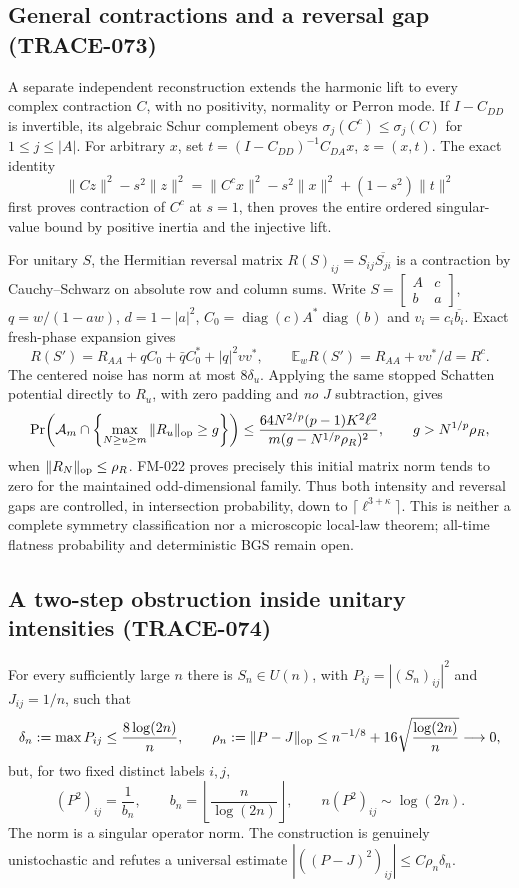 \subsection{General contractions and a reversal gap (TRACE-073)}
A separate independent reconstruction extends the harmonic lift to every
complex contraction $C$, with no positivity, normality or Perron mode.
If $I-C_{DD}$ is invertible, its algebraic Schur complement obeys
$\sigma_j(C^c)\le\sigma_j(C)$ for $1\le j\le|A|$. For arbitrary $x$, set
$t=(I-C_{DD})^{-1}C_{DA}x$, $z=(x,t)$. The exact identity
\[
 \|Cz\|^2-s^2\|z\|^2
 =\|C^cx\|^2-s^2\|x\|^2+(1-s^2)\|t\|^2
\]
first proves contraction of $C^c$ at $s=1$, then proves the entire ordered
singular-value bound by positive inertia and the injective lift.

For unitary $S$, the Hermitian reversal matrix
$R(S)_{ij}=S_{ij}\overline{S_{ji}}$ is a contraction by Cauchy--Schwarz
on absolute row and column sums. Write $S=\left[\begin{smallmatrix}A&c\\b&a\end{smallmatrix}\right]$,
$q=w/(1-aw)$, $d=1-|a|^2$, $C_0=\operatorname{diag}(c)A^*\operatorname{diag}(b)$
and $v_i=c_i\overline{b_i}$. Exact fresh-phase expansion gives
\[
 R(S')=R_{AA}+qC_0+\bar qC_0^*+|q|^2vv^*,
 \qquad \mathbb E_wR(S')=R_{AA}+vv^*/d=R^c.
\]
The centered noise has norm at most $8\delta_u$. Applying the same stopped
Schatten potential directly to $R_u$, with zero padding and \emph{no}
$J$ subtraction, gives
\[
 \Pr\!\left(\mathcal A_m\cap
        \left\{\max_{N\ge u\ge m}\|R_u\|_{\rm op}\ge g\right\}\right)
 \le\frac{64N^{2/p}(p-1)K^2\ell^2}
              {m(g-N^{1/p}\rho_R)^2},
 \qquad g>N^{1/p}\rho_R,
\]
when $\|R_N\|_{\rm op}\le\rho_R$. FM-022 proves precisely this initial
matrix norm tends to zero for the maintained odd-dimensional family.
Thus both intensity and reversal gaps are controlled, in intersection
probability, down to $\lceil\ell^{3+\kappa}\rceil$. This is neither a
complete symmetry classification nor a microscopic local-law theorem;
all-time flatness probability and deterministic BGS remain open.

\subsection{A two-step obstruction inside unitary intensities (TRACE-074)}
For every sufficiently large $n$ there is $S_n\in U(n)$, with
$P_{ij}=|(S_n)_{ij}|^2$ and $J_{ij}=1/n$, such that
\[
 \delta_n:=\max P_{ij}\le\frac{8\log(2n)}n,\qquad
 \rho_n:=\|P-J\|_{\rm op}\le n^{-1/8}
             +16\sqrt{\frac{\log(2n)}n}\longrightarrow0,
\]
but, for two fixed distinct labels $i,j$,
\[
 (P^2)_{ij}=\frac1{b_n},\qquad
 b_n=\left\lfloor\frac n{\log(2n)}\right\rfloor,\qquad
 n(P^2)_{ij}\sim\log(2n).
\]
The norm is a singular operator norm. The construction is genuinely
unistochastic and refutes a universal estimate
$|((P-J)^2)_{ij}|\le C\rho_n\delta_n$.

